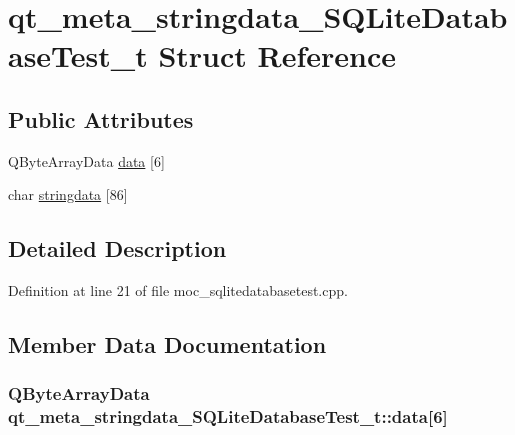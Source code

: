 \hypertarget{structqt__meta__stringdata___s_q_lite_database_test__t}{}\section{qt\+\_\+meta\+\_\+stringdata\+\_\+\+S\+Q\+Lite\+Database\+Test\+\_\+t Struct Reference}
\label{structqt__meta__stringdata___s_q_lite_database_test__t}
\subsection*{Public Attributes}
\begin{DoxyCompactItemize}
\item 
Q\+Byte\+Array\+Data \hyperlink{structqt__meta__stringdata___s_q_lite_database_test__t_a0a3c7c837336d03bdd7a6753977f778d}{data} \mbox{[}6\mbox{]}
\item 
char \hyperlink{structqt__meta__stringdata___s_q_lite_database_test__t_a3df12543448040dd161129950d12908e}{stringdata} \mbox{[}86\mbox{]}
\end{DoxyCompactItemize}


\subsection{Detailed Description}


Definition at line 21 of file moc\+\_\+sqlitedatabasetest.\+cpp.



\subsection{Member Data Documentation}
\hypertarget{structqt__meta__stringdata___s_q_lite_database_test__t_a0a3c7c837336d03bdd7a6753977f778d}{}
\subsubsection[{data}]{\setlength{\rightskip}{0pt plus 5cm}Q\+Byte\+Array\+Data qt\+\_\+meta\+\_\+stringdata\+\_\+\+S\+Q\+Lite\+Database\+Test\+\_\+t\+::data\mbox{[}6\mbox{]}}\label{structqt__meta__stringdata___s_q_lite_database_test__t_a0a3c7c837336d03bdd7a6753977f778d}


